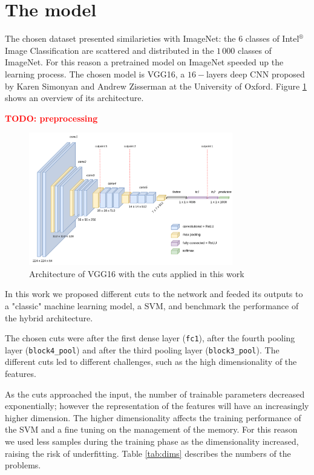 \documentclass[compsoc]{IEEEtran}
\newcommand\todo[1]{\textcolor{red}{\textbf{TODO: #1}}}
\begin{document}
\section{The model} 
The chosen dataset presented similarieties with ImageNet: the $6$ classes of Intel$^\circledR$ Image Classification are scattered and distributed in the $1\,000$ classes of ImageNet. For this reason a pretrained model on ImageNet speeded up the learning process. The chosen model is VGG16, a $16-$layers deep CNN proposed by Karen Simonyan and Andrew Zisserman at the University of Oxford\cite{vgg16}. Figure \ref{fig:vgg16} shows an overview of its architecture.

\todo{preprocessing}


\begin{figure}[ht!]
\centering                                                                        
\includegraphics[width=3.5in]{../images/vgg16.png}
\captionsetup{justification=centering}                                                                                         
\caption{Architecture of VGG16 with the cuts applied in this work}
\label{fig:vgg16}                                                                                                                               
\end{figure}

In this work we proposed different cuts to the network and feeded its outputs to a "classic" machine learning model, a SVM, and benchmark the performance of the hybrid architecture. \par

The chosen cuts were after the first dense layer (\texttt{fc1}), after the fourth pooling layer (\texttt{block4\_pool}) 
and after the third pooling layer (\texttt{block3\_pool}). The different cuts led to different challenges, such as the high dimensionality of the features.


As the cuts approached the input, the number of trainable parameters decreased exponentially; however the representation of the features will have an increasingly higher dimension. The higher dimensionality affects the training performance of the SVM and a fine tuning on the management of the memory. For this reason we used less samples during the training phase as the dimensionality increased, raising the risk of underfitting. Table \ref{tab:dims} describes the numbers of the problems.
\end{document}

